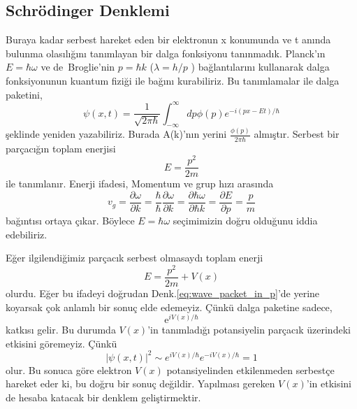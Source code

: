 \documentclass[a4paper,12pt, twoside]{article}
\begin{document}
\subsection{Schrödinger Denklemi}

Buraya kadar serbest hareket eden bir elektronun x konumunda ve t anında bulunma olasılığını tanımlayan bir dalga fonksiyonu tanınmadık. Planck'ın $E=\hbar\omega$  ve de~Broglie'nin $p=\hbar k$  ($\lambda = h/p$ )  bağlantılarını kullanarak  dalga fonksiyonunun kuantum fiziği ile bağını kurabiliriz.  Bu tanımlamalar ile dalga paketini,
\begin{equation}
\psi \left( x,t\right) =\dfrac {1}{\sqrt {2\pi \hbar }}\int ^{\infty }_{-\infty }dp\phi \left( p\right) e^{-i\left( px-Et\right) /\hbar }
\label{eq:wave_packet_in_p}
\end{equation}
şeklinde yeniden yazabiliriz.  Burada A(k)'nın  yerini $\frac{\phi(p)}{2\pi\hbar}$  almıştır.  Serbest bir parçacığın toplam enerjisi
\begin{equation*}
E=\dfrac {p^{2}}{2m}
\end{equation*}
ile tanımlanır.  Enerji ifadesi,  Momentum ve grup hızı arasında
\begin{equation*}
v_{g}=\dfrac {\partial \omega }{\partial k}=\dfrac {\hbar }{\hbar }\dfrac {\partial \omega }{\partial k}=\dfrac {\partial\hbar \omega }{\partial \hbar k}=\dfrac {\partial E}{\partial p}=\dfrac {p}{m}
\end{equation*}
bağıntısı ortaya çıkar.  Böylece $E=\hbar \omega$ seçimimizin doğru olduğunu iddia edebiliriz. 

Eğer ilgilendiğimiz parçacık serbest olmasaydı toplam enerji
\begin{equation*}
E=\dfrac {p^{2}}{2m} + V(x)
\end{equation*}
olurdu.  Eğer bu ifadeyi doğrudan Denk.\ref{eq:wave_packet_in_p}'de yerine koyarsak çok anlamlı bir sonuç elde edemeyiz.  Çünkü dalga paketine sadece,
\begin{equation*}
\text{e}^{iV\left( x\right) /\hbar }
\end{equation*}
katkısı gelir.  Bu durumda $V(x)$'in  tanımladığı potansiyelin parçacık üzerindeki etkisini göremeyiz.  Çünkü
\begin{equation*}
\left| \psi \left( x,t\right) \right| ^{2}\sim e^{iV\left( x\right) /\hbar }e^{-iV\left( x\right) /\hbar }=1
\end{equation*}
olur. Bu sonuca göre elektron $V(x)$  potansiyelinden  etkilenmeden serbestçe hareket eder ki,  bu doğru bir  sonuç değildir. Yapılması gereken $V(x)$'in etkisini de hesaba katacak bir denklem geliştirmektir.
\end{document}
